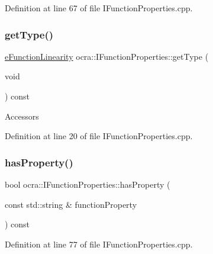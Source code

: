Definition at line 67 of file I\+Function\+Properties.\+cpp.

\hypertarget{classocra_1_1IFunctionProperties_a247de3887681fa72014273d131a2e090}{}\label{classocra_1_1IFunctionProperties_a247de3887681fa72014273d131a2e090} 
\subsubsection{\texorpdfstring{get\+Type()}{getType()}}
{\footnotesize\ttfamily \hyperlink{namespaceocra_a87b525b5508b0f6e9d931f14c7c226ab}{e\+Function\+Linearity} ocra\+::\+I\+Function\+Properties\+::get\+Type (\begin{DoxyParamCaption}\item[{void}]{ }\end{DoxyParamCaption}) const}

Accessors 

Definition at line 20 of file I\+Function\+Properties.\+cpp.

\hypertarget{classocra_1_1IFunctionProperties_a9484dcc696cc2425ae1e1e10fa79b5ba}{}\label{classocra_1_1IFunctionProperties_a9484dcc696cc2425ae1e1e10fa79b5ba} 
\subsubsection{\texorpdfstring{has\+Property()}{hasProperty()}}
{\footnotesize\ttfamily bool ocra\+::\+I\+Function\+Properties\+::has\+Property (\begin{DoxyParamCaption}\item[{const std\+::string \&}]{function\+Property }\end{DoxyParamCaption}) const}



Definition at line 77 of file I\+Function\+Properties.\+cpp.

\hypertarget{classocra_1_1IFunctionProperties_abc723a9def6656293c2e9ffeef133d65}{}\label{classocra_1_1IFunctionProperties_abc723a9def6656293c2e9ffeef133d65} 
